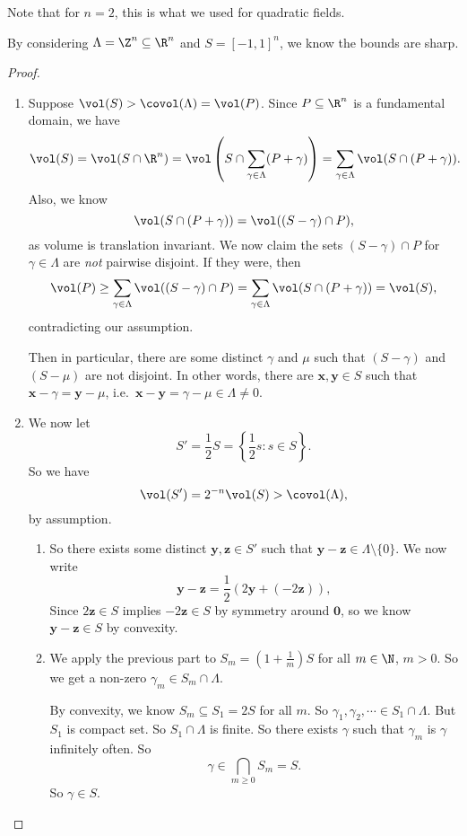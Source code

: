 \documentclass[a4paper]{article}
\begin{document}
Note that for $n = 2$, this is what we used for quadratic fields.

By considering $\Lambda = \Z^n \subseteq \R^n$ and $S = [-1, 1]^n$, we know the bounds are sharp.

\begin{proof}\leavevmode
  \begin{enumerate}
    \item Suppose $\vol(S) > \covol(\Lambda) = \vol(P)$. Since $P \subseteq \R^n$ is a fundamental domain, we have
      \[
        \vol(S) = \vol(S \cap \R^n) = \vol\left(S \cap \sum_{\gamma \in \Lambda} (P + \gamma)\right) = \sum_{\gamma \in \Lambda} \vol(S \cap (P + \gamma)).
      \]
      Also, we know
      \[
        \vol(S \cap (P + \gamma)) = \vol((S - \gamma) \cap P),
      \]
      as volume is translation invariant. We now claim the sets $(S - \gamma) \cap P$ for $\gamma \in \Lambda$ are \emph{not} pairwise disjoint. If they were, then
      \[
        \vol(P) \geq \sum_{\gamma \in \Lambda} \vol((S - \gamma) \cap P) = \sum_{\gamma \in \Lambda} \vol(S \cap (P + \gamma)) = \vol(S),
      \]
      contradicting our assumption.

      Then in particular, there are some distinct $\gamma$ and $\mu$ such that $(S - \gamma)$ and $(S - \mu)$ are not disjoint. In other words, there are $\mathbf{x}, \mathbf{y} \in S$ such that $\mathbf{x} - \gamma = \mathbf{y} - \mu$, i.e.\ $\mathbf{x} - \mathbf{y} = \gamma - \mu \in \Lambda \not= 0$.
    \item We now let
      \[
        S' = \frac{1}{2} S = \left\{\frac{1}{2}s: s \in S\right\}.
      \]
      So we have
      \[
        \vol(S') = 2^{-n} \vol(S) > \covol(\Lambda),
      \]
      by assumption.
      \begin{enumerate}
        \item So there exists some distinct $\mathbf{y}, \mathbf{z} \in S'$ such that $\mathbf{y} - \mathbf{z} \in \Lambda \setminus \{0\}$. We now write
          \[
            \mathbf{y} - \mathbf{z} = \frac{1}{2} (2\mathbf{y} + (-2\mathbf{z})),
          \]
          Since $2\mathbf{z} \in S$ implies $-2\mathbf{z} \in S$ by symmetry around $\mathbf{0}$, so we know $\mathbf{y} - \mathbf{z} \in S$ by convexity.
        \item We apply the previous part to $S_m = \left(1 + \frac{1}{m}\right)S$ for all $m \in \N$, $m > 0$. So we get a non-zero $\gamma_m \in S_m \cap \Lambda$.

          By convexity, we know $S_m \subseteq S_1 = 2S$ for all $m$. So $\gamma_1, \gamma_2, \cdots \in S_1 \cap \Lambda$. But $S_1$ is compact set. So $S_1 \cap \Lambda$ is finite. So there exists $\gamma$ such that $\gamma_m$ is $\gamma$ infinitely often. So
          \[
            \gamma \in \bigcap_{m \geq 0} S_m = S.
          \]
          So $\gamma \in S$.
      \end{enumerate}
  \end{enumerate}
\end{proof}
\end{document}
